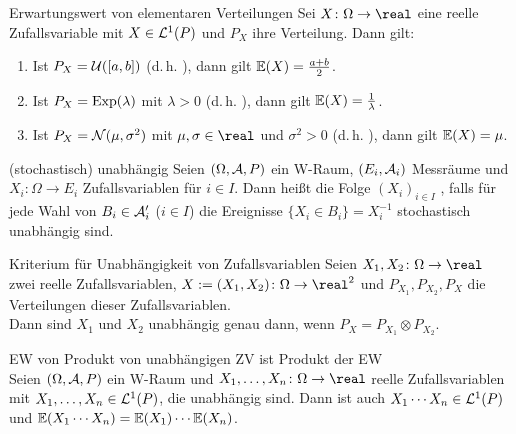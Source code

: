 \begin{Satz}{Erwartungswert von elementaren Verteilungen}
    Sei $X\colon \Omega \rightarrow \real$ eine reelle Zufallsvariable mit $X \in \mathcal{L}^1(P)$
    und $P_X$ ihre Verteilung.
    Dann gilt:
    \begin{enumerate}
        \item
        Ist $P_X = \mathcal{U}([a, b])$ (d.\,h. ),
        dann gilt $\mathbb{E}(X) = \frac{a + b}{2}$.

        \item
        Ist $P_X = \text{Exp}(\lambda)$ mit $\lambda > 0$ (d.\,h. ),
        dann gilt $\mathbb{E}(X) = \frac{1}{\lambda}$.

        \item
        Ist $P_X = \mathcal{N}(\mu, \sigma^2)$ mit $\mu, \sigma \in \real$ und $\sigma^2 > 0$
        (d.\,h. ),
        dann gilt $\mathbb{E}(X) = \mu$.
    \end{enumerate}
\end{Satz}

\linie

\begin{Def}{(stochastisch) unabhängig}
    Seien $(\Omega, \mathcal{A}, P)$ ein W-Raum, $(E_i, \mathcal{A}_i)$ Messräume und\\
    $X_i\colon \Omega \rightarrow E_i$ Zufallsvariablen für $i \in I$.
    Dann heißt die Folge $(X_i)_{i \in I}$ , falls
    für jede Wahl von $B_i \in \mathcal{A}_i'$ ($i \in I$)
    die Ereignisse $\{X_i \in B_i\} = X_i^{-1}$ stochastisch unabhängig sind.
\end{Def}

\begin{Lemma}{Kriterium für Unabhängigkeit von Zufallsvariablen}
    Seien $X_1, X_2\colon \Omega \rightarrow \real$ zwei reelle Zufallsvariablen,
    $X := (X_1, X_2)\colon \Omega \rightarrow \real^2$ und
    $P_{X_1}, P_{X_2}, P_X$ die Verteilungen dieser Zufallsvariablen.\\
    Dann sind $X_1$ und $X_2$ unabhängig genau dann, wenn $P_X = P_{X_1} \otimes P_{X_2}$.
\end{Lemma}

\begin{Satz}{EW von Produkt von unabhängigen ZV ist Produkt der EW}\\
    Seien $(\Omega, \mathcal{A}, P)$ ein W-Raum und $X_1, \dotsc, X_n\colon \Omega \rightarrow \real$
    reelle Zufallsvariablen mit $X_1, \dotsc, X_n \in \mathcal{L}^1(P)$, die unabhängig sind.
    Dann ist auch $X_1 \dotsm X_n \in \mathcal{L}^1(P)$ und
    $\mathbb{E}(X_1 \dotsm X_n) = \mathbb{E}(X_1) \dotsm \mathbb{E}(X_n)$.
\end{Satz}

